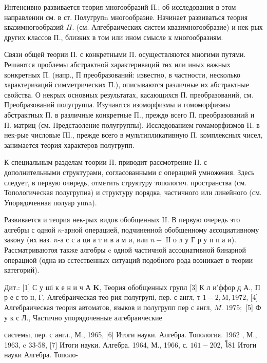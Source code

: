 \documentclass[10pt]{article}
\begin{document}
Интенсивно развивается теория многообразий П.; об исследования в этом направлении см. в ст. Полугрупn многообразие. Начинает развиваться теория квазимногообразий $\Pi$. (см. Алгебраических систем квазимногообразие) и нек-рых других классов П., близких в том или ином смысле к многообразиям.



Связи общей теории П. с конкретными П. осуществляются многими путями. Решаются проблемы абстрактной характериваций төх или иных важных конкретных П. (напр., П преобразований: известно, в частности, несколько характеризаций симметрических П.), описываются различные их абстрактные свойства. О некрых основных результатах, касающихся П. преобразований, см. Преобразований полугруппа. Изучаются изоморфизмы и гомоморфизмы абстрактных П. в различные конкретные П., преждө всего П. преобразований и П. матриц (см. Предстаөление полугруппы). Исследованием гомаморфизмов П. в нек-рые числовые ПІ., прежде всего в мультипликативную П. комплексных чисел, занимается теория характеров полугрупп.



К специальным разделам төории П. приводит рассмотрение П. с дополнительными структурами, согласованными с операцией умножения. Здесь следует, в первую очөредь, отметить структуру топологич. пространства (см. Топологическая полугрупиа) и структуру порядка, частичного или линейного (см. Упорядоченная полуар упna).



Развивается и теория нек-рых видов обобщенных II. В первую очередь это алгебры с одной $n$-арной операцией, подчиненноӥ обобщенному аєсоциативному закону (их наз. $n$-а с с а ци а т и в а м и, или $n-$ ІІ о л у Г р у п п а и). Рассматриваютоя также алгөбры $\mathrm{c}$ одной частичной ассоциативной бинарной операциөй (одна из сстественных ситуаций подобного рода возникает в теории категорий).



Дит.: [1] С у ші к е н и ч А $\mathbf{K}$, Теория обобщенных групл [3] К л и'ффор д А., П р е с то н, Г, Алгебраическая тео рия полугрупі, пер. с англ, т $1-2, \mathrm{M}, 1972$, [4] Алгебраическая теория автоматов, языков и полугрупп пер с англ, $M$. $1975 ;$ [5] Ф у к с Л., Частично упорядоченные алгебраические

системы, пер. с англ., М., 1965, [6] Итоги науки. Алгебра. Топология. 1962 , М., 1963, c 33-58, [7] Итоги науки. Алгебра. 1964, М., 1966, с. $161-202$, โ81 Итоги науки Алгебра. Тополо-
\end{document}
